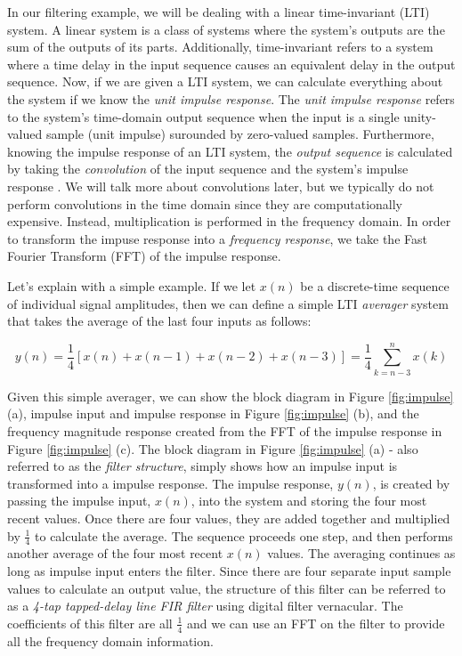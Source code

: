  In our filtering example, we will be dealing with a linear
 time-invariant (LTI) system. A linear system is a class of
 systems where the system's outputs are the sum of the outputs of
 its parts. Additionally, time-invariant refers to a system
 where a time delay in the input sequence causes an equivalent
 delay in the output sequence. Now, if we are given a LTI system,
 we can calculate everything about the system if we know the
 \textit{unit impulse response}. The \textit{unit impulse
 response} refers to the system's time-domain output sequence
 when the input is a single unity-valued sample (unit impulse)
 surounded by zero-valued samples. Furthermore, knowing the
 impulse response of an LTI system, the \textit{output sequence}
 is calculated by taking the \textit{convolution} of the input
 sequence and the system's impulse response \cite{lyons:intro}.
 We will talk more about convolutions later, but we typically do
 not perform convolutions in the time domain since they are
 computationally expensive. Instead, multiplication is performed
 in the frequency domain. In order to transform the impuse
 response into a \textit{frequency response}, we take the Fast
 Fourier Transform (FFT) of the impulse
 response\cite{lyons:intro}.

Let's explain with a simple example. If we let $x(n)$ be a
discrete-time sequence of individual signal amplitudes, then we
can define a simple LTI \textit{averager} system that takes the
average of the last four inputs as follows:

$$y(n) = \frac{1}{4} \left[ x(n)+x(n-1)+x(n-2)+x(n-3)\right] =  \frac{1}{4}\sum_{k=n-3}^{n} x(k)$$    

Given this simple averager, we can show the block diagram in
Figure \ref{fig:impulse} (a), impulse input and impulse response
in Figure \ref{fig:impulse} (b), and the frequency magnitude
response created from the FFT of the impulse response in Figure
\ref{fig:impulse} (c). The block diagram in Figure
\ref{fig:impulse} (a) - also referred to as the \textit{filter
structure}, simply shows how an impulse input is transformed into
a impulse response. The impulse response, $y(n)$, is created by
passing the impulse input, $x(n)$, into the system and storing
the four most recent values. Once there are four values, they are
added together and multiplied by $\frac{1}{4}$ to calculate the
average. The sequence proceeds one step, and then performs
another average of the four most recent $x(n)$ values. The
averaging continues as long as impulse input enters the filter.
Since there are four separate input sample values to calculate an
output value, the structure of this filter can be referred to as
a \textit{4-tap tapped-delay line FIR filter} using digital
filter vernacular. The coefficients of this filter are all
$\frac{1}{4}$ and we can use an FFT on the filter to provide all
the frequency domain information.

